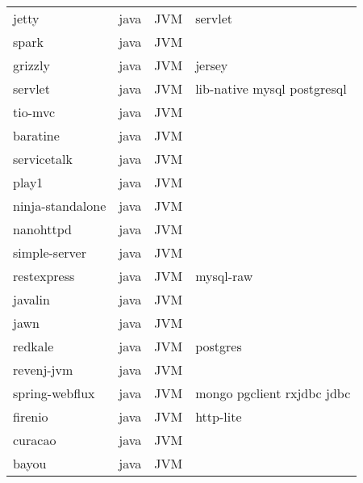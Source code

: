\begin{longtable}{llll}
    jetty            & java & JVM       & servlet                                            \\
    spark            & java & JVM       &                                                    \\
    grizzly          & java & JVM       & jersey                                             \\
    servlet          & java & JVM       & lib-native mysql postgresql                        \\
    tio-mvc          & java & JVM       &                                                    \\
    baratine         & java & JVM       &                                                    \\
    servicetalk      & java & JVM       &                                                    \\
    play1            & java & JVM       &                                                    \\
    ninja-standalone & java & JVM       &                                                    \\
    nanohttpd        & java & JVM       &                                                    \\
    simple-server    & java & JVM       &                                                    \\
    restexpress      & java & JVM       & mysql-raw                                          \\
    javalin          & java & JVM       &                                                    \\
    jawn             & java & JVM       &                                                    \\
    redkale          & java & JVM       & postgres                                           \\
    revenj-jvm       & java & JVM       &                                                    \\
    spring-webflux   & java & JVM       & mongo pgclient rxjdbc jdbc                         \\
    firenio          & java & JVM       & http-lite                                          \\
    curacao          & java & JVM       &                                                    \\
    bayou            & java & JVM       &                                                    \\

\end{longtable}
